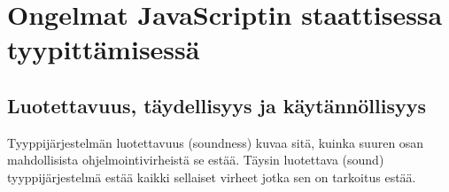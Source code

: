 \chapter{Ongelmat JavaScriptin staattisessa tyypittämisessä}

\section{Luotettavuus, täydellisyys ja käytännöllisyys}
Tyyppijärjestelmän luotettavuus (soundness) kuvaa sitä, kuinka suuren osan
mahdollisista ohjelmointivirheistä se estää. Täysin luotettava (sound)
tyyppijärjestelmä estää kaikki sellaiset virheet jotka sen on tarkoitus
estää.
